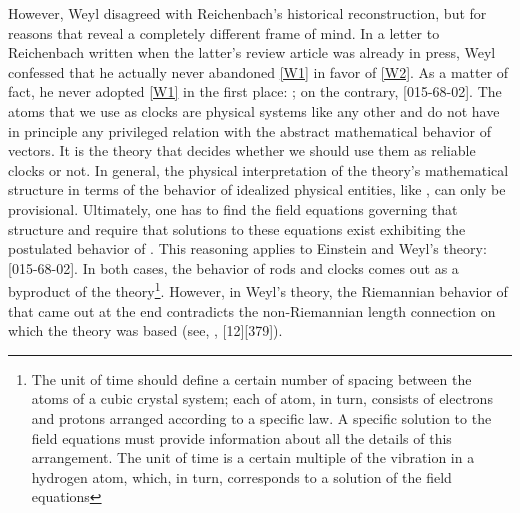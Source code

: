 \documentclass[final]{article}
\newcommand{\WT}{Weyl's theory\xspace}
\begin{document}
However, Weyl disagreed with Reichenbach's historical reconstruction, but for reasons that reveal a completely different frame of mind. In a letter to Reichenbach written when the latter's review article was already in press, Weyl confessed that he actually never abandoned \ref{W1} in favor of \ref{W2}. As a matter of fact, he never adopted \ref{W1} in the first place: ; on the contrary,  [015-68-02]. The atoms that we use as clocks are physical systems like any other and do not have in principle any privileged relation with the abstract mathematical behavior of vectors. It is the theory that decides whether we should use them as reliable clocks or not. In general, the physical interpretation of the theory's mathematical structure in terms of the behavior of idealized physical entities, like \rac, can only be provisional. Ultimately, one has to find the field equations governing that structure and require that solutions to these equations exist exhibiting the postulated behavior of \rac. This reasoning applies to Einstein and \WT:  [015-68-02]. In both cases, the behavior of rods and clocks comes out as a byproduct of the theory\footnote{The unit of time should define a certain number of spacing between the atoms of a cubic crystal system; each of atom, in turn, consists of electrons and protons arranged according to a specific law. A specific solution to the field equations must provide information about all the details of this arrangement. The unit of time is a certain multiple of the vibration in a hydrogen atom, which, in turn, corresponds to a solution of the field equations}. However, in \WT, the Riemannian behavior of \rac that came out at the end contradicts the non-Riemannian length connection on which the theory was based (see, \eg, [12][379]).
\end{document}
